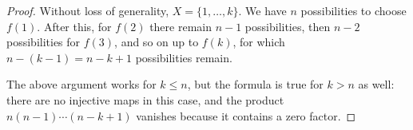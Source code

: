 

\setcounter{section}{2}
\setcounter{subsection}{3}
\setcounter{dfn}{8}

\begin{proof}
Without loss of generality, $X = \{1, \ldots, k\}$.
We have $n$ possibilities to choose $f(1)$.
After this, for $f(2)$ there remain $n-1$ possibilities, then $n-2$ possibilities for $f(3)$,
and so on up to $f(k)$, for which $n-(k-1) = n-k+1$ possibilities remain.

The above argument works for $k \le n$, but the formula is true for $k > n$ as well:
there are no injective maps in this case, and the product $n(n-1) \cdots (n-k+1)$ vanishes because it contains a zero factor.
\end{proof}




